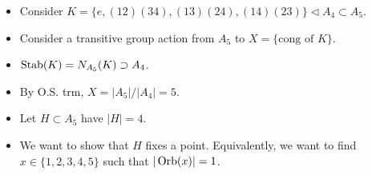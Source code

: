 \documentclass[../notes.tex]{subfiles}
\begin{document}
\begin{itemize}
\begin{itemize}
\begin{itemize}
            \item Another way we could show this is by counting all of the 5-cycles and knowing that they are all conjugate as 5-cycles. Indeed, there are $4!=24$ 5-cycles.
        \end{itemize}
        \item Claim: In $A_5$, $|x|=5$ implies $x\sim x$, $x\nsim x^2$, $x\nsim x^3$, and $x\sim x^4=x^{-1}$.
        \begin{proof}
            We know that $|x|=5$. Thus, let $x=(abcde)$.\par
            By the above statements on $C_{S_5}((12345))$, we know that $C_{S_5}(x)\subset A_5$. Thus, by proposition 2, $gxg^{-1}=x'$ iff $g\in A_n$. Thus,
            \begin{align*}
                exe^{-1} = x &\quad\Longrightarrow\quad x\sim x\\
                [(bc)(cd)(de)]x[(bc)(cd)(de)]^{-1} = (bced)(abcde)(bced)^{-1} = (acebd) &\quad\Longrightarrow\quad x\nsim x^2\\
                (bdec)(abcde)(bdec)^{-1} = (adbec) &\quad\Longrightarrow\quad x\nsim x^3\\
                [(be)(cd)](abcde)[(be)(cd)]^{-1} = (aedcb) &\quad\Longrightarrow\quad x\sim x^4=x^{-1}
            \end{align*}
            as desired.
        \end{proof}
        \item $x^2\sim x^3$ in $A_5$ as well.
        \item $(abced)$ and $(acebd)$ are conjugate by $(bce)\in A_5$.
        \item Six subgroups, all conjugate.
        \item All of the subgroups are conjugate, but not all of the elements are conjugate?
    \end{itemize}
    \item Consider $K=\{e,(12)(34),(13)(24),(14)(23)\}\triangleleft A_4\subset A_5$.
    \item Consider a transitive group action from $A_5$ to $X=\{\text{cong of }K\}$.
    \item $\operatorname{Stab}(K)=N_{A_5}(K)\supset A_4$.
    \item By O.S. trm, $X=|A_5|/|A_4|=5$.
    \item Let $H\subset A_5$ have $|H|=4$.
    \item We want to show that $H$ fixes a point. Equivalently, we want to find $x\in\{1,2,3,4,5\}$ such that $|\operatorname{Orb}(x)|=1$.

\end{itemize}
\end{document}
